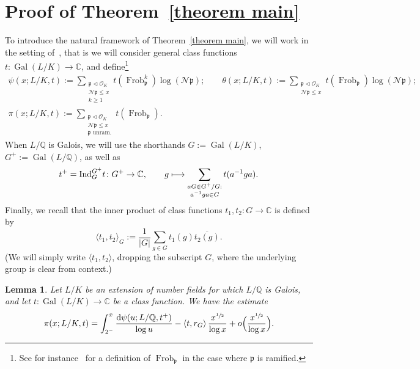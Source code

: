 \documentclass[10pt]{amsart}
\let\mathcal\mathscr
\def\mto{\mathchoice{\longmapsto}{\mapsto}{\mapsto}{\mapsto}}
\DeclareMathOperator{\Frob}{Frob}
\newtheorem{lemma}[X]{Lemma}
\theoremstyle{definition}
\DeclareMathOperator{\Gal}{Gal}
\newcommand{\Q}{\mathbb Q}
\renewcommand{\d}{\mathrm{d}}
\begin{document}
\section{Proof of Theorem~\ref{theorem main}}\label{sec:mainproof}

To introduce the natural framework of Theorem~\ref{theorem main}, we will work in the setting of~\cite{Be}, that is we will consider general class functions $t\colon\Gal(L/K)\to \mathbb C$, and define\footnote{See for instance~\cite[Chap.\,1 \S4]{Mar} for a definition of $\Frob_\mathfrak p$ in the case where $\mathfrak p$ is ramified.}
\begin{gather*}
\psi(x;L/K,t):= \sum_{\substack{\mathfrak p\triangleleft \mathcal O_K\\ \mathcal N\mathfrak p \leq x \\ k\geq 1 }} t(\Frob_\mathfrak p^k) \log (\mathcal N\mathfrak p);\qquad \theta(x;L/K,t):= \sum_{\substack{\mathfrak p\triangleleft \mathcal O_K\\ \mathcal N\mathfrak p \leq x }} t(\Frob_\mathfrak p)\log (\mathcal N\mathfrak p);\\[-5pt]
\pi(x;L/K,t):= \sum_{\substack{\mathfrak p\triangleleft \mathcal O_K\\ \mathcal N\mathfrak p \leq x \\ \mathfrak p \text{ unram.}}} t(\Frob_\mathfrak p).
\end{gather*}
When $L/\Q$ is Galois, we will use the shorthands $G:=\Gal(L/K)$, $G^+:=\Gal(L/\Q)$, as well as
\[ t^+ = \mathrm{Ind}_G^{G^+} t \colon G^+\to \mathbb C,\qquad g\mto \sum_{\substack{aG\in G^+/G : \\a^{-1} g a \in G }} t(a^{-1} g a).
\]
Finally, we recall that the inner product of class functions $t_1,t_2\colon G \to \mathbb C$ is defined by
\[ \langle t_1 , t_2 \rangle_G := \frac 1{|G|} \sum_{g\in G} t_1(g)\overline{t_2(g)}. \]
(We will simply write $\langle t_1,t_2\rangle$, dropping the subscript $G$, where the underlying group is clear from context.)

\begin{lemma}
\label{lemma mobius and sbp}
Let $L/K$ be an extension of number fields for which $L/\Q$ is Galois, and let $t\colon\Gal(L/K)\to \mathbb C$ be a class function. We have the estimate
\[ \pi(x;L/K,t) = \int_{2^-}^x \frac{\d \psi(u;L/\Q,t^+) }{\log u} -\langle t,r_G \rangle\, \frac{x^{\sfrac 12}}{\log x}+ o\Big(\frac{x^{\sfrac 12}}{\log x}\Big). \]
\end{lemma}
\end{document}
